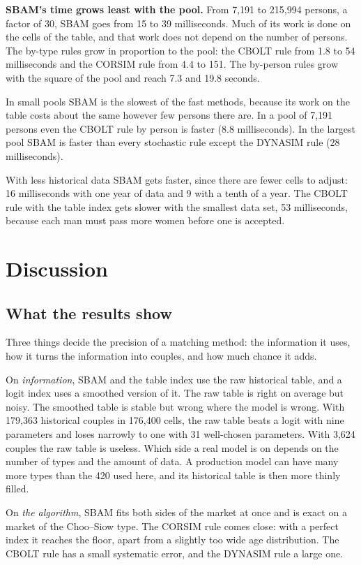 \documentclass[12pt,a4paper]{article}
\begin{document}
\textbf{SBAM's time grows least with the pool.} From 7,191 to 215,994 persons, a factor of 30,
SBAM goes from 15 to 39 milliseconds. Much of its work is done on the cells of the table, and
that work does not depend on the number of persons. The by-type rules grow in
proportion to the pool: the CBOLT rule from 1.8 to 54 milliseconds and the CORSIM rule from 4.4
to 151. The by-person rules grow with the square of the pool and reach 7.3 and 19.8 seconds.

In small pools SBAM is the slowest of the fast methods, because its work on the table costs
about the same however few persons there are. In a pool of 7,191 persons even the CBOLT rule by
person is faster (8.8 milliseconds). In the largest pool SBAM is faster than every stochastic
rule except the DYNASIM rule (28 milliseconds).

With less historical data SBAM gets faster, since there are fewer cells to adjust: 16
milliseconds with one year of data and 9 with a tenth of a year. The CBOLT rule with the table
index gets slower with the smallest data set, 53 milliseconds, because each man must pass more
women before one is accepted.

\section{Discussion}\label{sec:discussion}

\subsection{What the results show}

Three things decide the precision of a matching method: the information it uses, how it turns
the information into couples, and how much chance it adds.

On \emph{information}, SBAM and the table index use the raw historical table, and a logit index
uses a smoothed version of it. The raw table is right on average but noisy. The smoothed table is
stable but wrong where the model is wrong. With 179,363 historical couples in 176,400 cells, the
raw table beats a logit with nine parameters and loses narrowly to one with 31 well-chosen
parameters. With 3,624 couples the raw table is useless. Which side a real model is on depends on
the number of types and the amount of data. A production model can have many more types than the
420 used here, and its historical table is then more thinly filled.

On \emph{the algorithm}, SBAM fits both sides of the market at once and is exact on a market of
the Choo--Siow type. The CORSIM rule comes close: with a perfect index it reaches the floor, apart
from a slightly too wide age distribution. The CBOLT rule has a small systematic error, and the
DYNASIM rule a large one.
\end{document}

